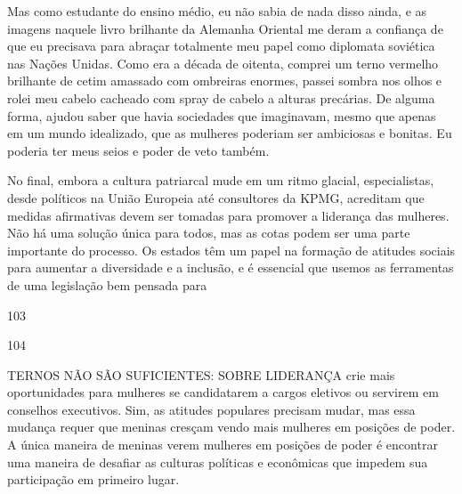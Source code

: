  \par 
Mas como estudante do ensino médio, eu não sabia de nada disso ainda, e as imagens naquele livro brilhante da Alemanha Oriental me deram a confiança de que eu precisava para abraçar totalmente meu papel como diplomata soviética nas Nações Unidas. Como era a década de oitenta, comprei um terno vermelho brilhante de cetim amassado com ombreiras enormes, passei sombra nos olhos e rolei meu cabelo cacheado com spray de cabelo a alturas precárias. De alguma forma, ajudou saber que havia sociedades que imaginavam, mesmo que apenas em um mundo idealizado, que as mulheres poderiam ser ambiciosas e bonitas. Eu poderia ter meus seios e poder de veto também.
 \par 
No final, embora a cultura patriarcal mude em um ritmo glacial, especialistas, desde políticos na União Europeia até consultores da KPMG, acreditam que medidas afirmativas devem ser tomadas para promover a liderança das mulheres. Não há uma solução única para todos, mas as cotas podem ser uma parte importante do processo. Os estados têm um papel na formação de atitudes sociais para aumentar a diversidade e a inclusão, e é essencial que usemos as ferramentas de uma legislação bem pensada para
 \par 
103
 \par 
104
 \par 
TERNOS NÃO SÃO SUFICIENTES: SOBRE LIDERANÇA crie mais oportunidades para mulheres se candidatarem a cargos eletivos ou servirem em conselhos executivos. Sim, as atitudes populares precisam mudar, mas essa mudança requer que meninas cresçam vendo mais mulheres em posições de poder. A única maneira de meninas verem mulheres em posições de poder é encontrar uma maneira de desafiar as culturas políticas e econômicas que impedem sua participação em primeiro lugar.
 \par 

